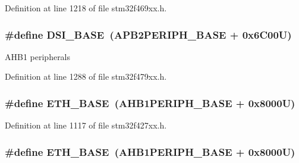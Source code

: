 Definition at line 1218 of file stm32f469xx.\+h.

\subsubsection[{\texorpdfstring{D\+S\+I\+\_\+\+B\+A\+SE}{DSI_BASE}}]{\setlength{\rightskip}{0pt plus 5cm}\#define D\+S\+I\+\_\+\+B\+A\+SE~({\bf A\+P\+B2\+P\+E\+R\+I\+P\+H\+\_\+\+B\+A\+SE} + 0x6\+C00\+U)}\hypertarget{group___peripheral__memory__map_gac094188b138a77bbac13d9361609b617}{}\label{group___peripheral__memory__map_gac094188b138a77bbac13d9361609b617}
A\+H\+B1 peripherals 

Definition at line 1288 of file stm32f479xx.\+h.

\subsubsection[{\texorpdfstring{E\+T\+H\+\_\+\+B\+A\+SE}{ETH_BASE}}]{\setlength{\rightskip}{0pt plus 5cm}\#define E\+T\+H\+\_\+\+B\+A\+SE~({\bf A\+H\+B1\+P\+E\+R\+I\+P\+H\+\_\+\+B\+A\+SE} + 0x8000\+U)}\hypertarget{group___peripheral__memory__map_gad965a7b1106ece575ed3da10c45c65cc}{}\label{group___peripheral__memory__map_gad965a7b1106ece575ed3da10c45c65cc}


Definition at line 1117 of file stm32f427xx.\+h.

\subsubsection[{\texorpdfstring{E\+T\+H\+\_\+\+B\+A\+SE}{ETH_BASE}}]{\setlength{\rightskip}{0pt plus 5cm}\#define E\+T\+H\+\_\+\+B\+A\+SE~({\bf A\+H\+B1\+P\+E\+R\+I\+P\+H\+\_\+\+B\+A\+SE} + 0x8000\+U)}\hypertarget{group___peripheral__memory__map_gad965a7b1106ece575ed3da10c45c65cc}{}\label{group___peripheral__memory__map_gad965a7b1106ece575ed3da10c45c65cc}


